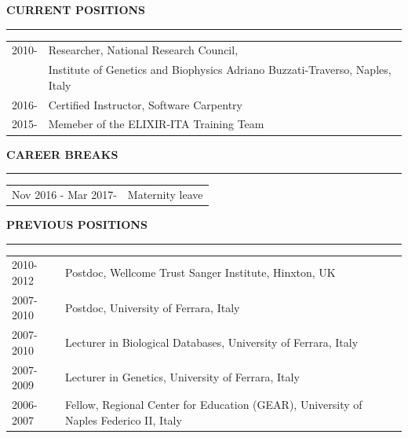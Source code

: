 \documentclass[openany]{book}
\begin{document}
\vspace{0.4cm}
\noindent
\MakeUppercase{\textbf{Current Positions}} \vspace{0.2cm}
\hrule
\vspace{0.2cm}
\noindent
\begin{tabular}{ l l }
 2010- & Researcher, National Research Council, \\
       & Institute of Genetics and Biophysics Adriano Buzzati-Traverso, Naples, Italy\\ 
 2016- & Certified Instructor, Software Carpentry \\
 2015- & Memeber of the ELIXIR-ITA Training Team \\ 
\end{tabular}
\newline 

\vspace{0.4cm}
\noindent
\MakeUppercase{\textbf{Career Breaks}} \vspace{0.2cm}
\hrule
\vspace{0.2cm}
\noindent
\begin{tabular}{ l l }
Nov 2016 - Mar 2017- & Maternity leave \\
\end{tabular}
\newline 

\vspace{0.4cm}
\noindent
\MakeUppercase{\textbf{Previous Positions}} \vspace{0.2cm}
\hrule
\vspace{0.2cm}
\noindent
\begin{tabular}{ l l  }
 
 2010-2012 & Postdoc, Wellcome Trust Sanger Institute, Hinxton, UK\\ 
 2007-2010 & Postdoc, University of Ferrara, Italy \\ 
 2007-2010 & Lecturer in Biological Databases, University of Ferrara, Italy \\
 2007-2009 & Lecturer in Genetics, University of Ferrara, Italy \\
 2006-2007 & Fellow, Regional Center for Education (GEAR), University of Naples Federico II, Italy \\ 
\end{tabular}
\newline 

\end{document}
